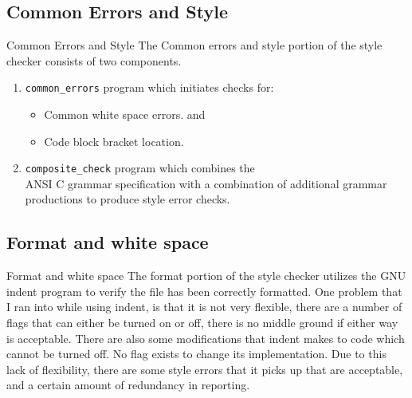\documentclass[compress]{beamer}
\begin{document}
\subsection{Common Errors and Style}
\begin{frame}{Common Errors and Style}
The Common errors and style portion of the style checker consists of two components.
\begin{enumerate}
	\item  \textcolor{hsrmSec2}{\texttt{common\_errors}} program which initiates checks for:
		\begin{itemize}
			\item Common white space errors. and
			\item Code block bracket location.
		\end{itemize}
	\item  \textcolor{hsrmSec2}{\texttt{composite\_check}} program which combines the \\
			ANSI C grammar specification with a combination of additional 
			grammar productions to produce style error checks.  
\end{enumerate}

\end{frame}


\subsection{Format and white space}
\begin{frame}{Format and white space}
The format portion of the style checker utilizes the GNU indent program to verify the file has been correctly formatted.
\note
{
	One problem that I ran into while using indent, is that it is not very flexible, there are a number of flags that can either be
	turned on or off, there is no middle ground if either way is acceptable.
	There are also some modifications that indent makes to code which cannot be turned off. No flag exists to change its implementation.
	Due to this lack of flexibility, there are some style errors that it picks up that are acceptable, and a certain amount of redundancy
	in reporting.
}
\end{frame}
\end{document}
